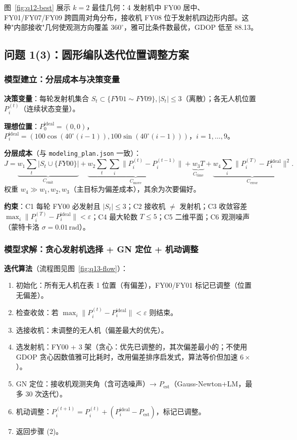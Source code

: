 \documentclass[12pt,a4paper]{ctexart}
\newcommand{\unit}[1]{\ensuremath{\,\mathrm{#1}}}
\newcommand{\figref}[1]{图~\ref{#1}}
\begin{document}
\figref{fig:q12-best} 展示 $k=2$ 最佳几何：4 发射机中 FY00 居中、FY01/FY07/FY09 跨圆周对角分布，接收机 FY08 位于发射机四边形内部。这种"内部接收"几何使观测方向覆盖 $360^\circ$，雅可比条件数最优，GDOP 低至 88.13。

\subsection{问题 1(3)：圆形编队迭代位置调整方案}

\subsubsection{模型建立：分层成本与决策变量}

\textbf{决策变量}：每轮发射机集合 $S_t\subset\{FY01\sim FY09\},|S_t|\leq 3$（离散）；各无人机位置 $P_i^{(t)}$（连续状态变量）。

\textbf{理想位置}：$P_0^{\text{ideal}}=(0,0)$，$P_i^{\text{ideal}}=(100\cos(40^\circ(i-1)),100\sin(40^\circ(i-1)))$，$i=1,\dots,9$。

\textbf{分层成本}（与 \texttt{modeling\_plan.json} 一致）：
\begin{equation}
J=\underbrace{w_1\sum_t|S_t\cup\{FY00\}|}_{C_{\text{emit}}}+\underbrace{w_2\sum_t\sum_i\|P_i^{(t)}-P_i^{(t-1)}\|}_{C_{\text{move}}}+\underbrace{w_3 T}_{C_{\text{time}}}+\underbrace{w_4\sum_i\|P_i^{(T)}-P_i^{\text{ideal}}\|^2}_{C_{\text{error}}}.
\label{eq:q13-cost}
\end{equation}
权重 $w_4\gg w_1,w_2,w_3$（主目标为偏差成本），其余为次要偏好。

\textbf{约束}：C1 每轮 FY00 必发射且 $|S_t|\leq 3$；C2 接收机 $\neq$ 发射机；C3 收敛容差 $\max_i\|P_i^{(T)}-P_i^{\text{ideal}}\|<\varepsilon$；C4 最大轮数 $T\leq 5$；C5 二维平面；C6 观测噪声（蒙特卡洛 $\sigma=0.01\unit{rad}$）。

\subsubsection{模型求解：贪心发射机选择 + GN 定位 + 机动调整}

\textbf{迭代算法}（流程图见\figref{fig:q13-flow}）：
\begin{enumerate}[label=(\arabic*), leftmargin=2em]
    \item 初始化：所有无人机在表 1 位置（有偏差），FY00/FY01 标记已调整（位置无偏差）。
    \item 检查收敛：若 $\max_i\|P_i^{(t)}-P_i^{\text{ideal}}\|<\varepsilon$ 则结束。
    \item 选接收机：未调整的无人机（偏差最大的优先）。
    \item 选发射机：FY00 + 3 架（贪心：优先已调整的，其次偏差最小的；不使用 GDOP 贪心因数值雅可比耗时，改用偏差排序启发式，算法等价但加速 $6\times$）。
    \item GN 定位：接收机观测夹角（含可选噪声）→ $P_{\text{est}}$（Gauss-Newton+LM，最多 30 次迭代）。
    \item 机动调整：$P_i^{(t+1)}=P_i^{(t)}+(P_i^{\text{ideal}}-P_{\text{est}})$，标记已调整。
    \item 返回步骤 (2)。
\end{enumerate}
\end{document}

